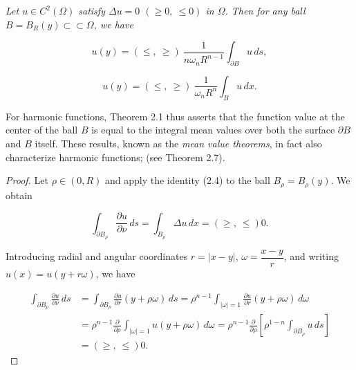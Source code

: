 


\begin{theorem}\label{gt.thm2.1}
\emph{Let $u \in C^2(\Omega)$ satisfy $\Delta u = 0$ $(\geq 0,\ \leq 0)$ in $\Omega$. Then for any ball
$B = B_R(y) \subset\subset \Omega$, we have}

\begin{equation}
u(y) = (\leq,\ \geq)\ \frac{1}{n\omega_n R^{n-1}} \int_{\partial B} u\,ds,
\tag{2.5}
\end{equation}

\begin{equation}
u(y) = (\leq,\ \geq)\ \frac{1}{\omega_n R^n} \int_{B} u\,dx.
\tag{2.6}
\end{equation}

\noindent For harmonic functions, Theorem 2.1 thus asserts that the function value at the center of the ball $B$ is equal to the integral mean values over both the surface $\partial B$ and $B$ itself. These results, known as the \emph{mean value theorems}, in fact also characterize harmonic functions; (see Theorem 2.7).

\medskip

\begin{proof}
Let $\rho \in (0, R)$ and apply the identity (2.4) to the ball $B_\rho = B_\rho(y)$. We obtain

\begin{equation*}
\int_{\partial B_\rho} \frac{\partial u}{\partial \nu}\,ds = \int_{B_\rho} \Delta u\,dx = (\geq,\ \leq) 0.
\end{equation*}

\noindent Introducing radial and angular coordinates $r = |x-y|$, $\omega = \dfrac{x-y}{r}$, and writing
$u(x) = u(y + r\omega)$, we have

\begin{align*}
\int_{\partial B_\rho} \frac{\partial u}{\partial \nu}\,ds
&= \int_{\partial B_\rho} \frac{\partial u}{\partial r}(y+\rho\omega)\,ds
 = \rho^{n-1}\int_{|\omega|=1}\frac{\partial u}{\partial r}(y+\rho\omega)\,d\omega \\
&= \rho^{n-1}\frac{\partial}{\partial \rho}\int_{|\omega|=1} u(y+\rho\omega)\,d\omega
 = \rho^{n-1}\frac{\partial}{\partial \rho}\left[\rho^{1-n}\int_{\partial B_\rho} u\,ds\right] \\
&= (\geq,\ \leq) 0.
\end{align*}


\end{proof}
\end{theorem}
